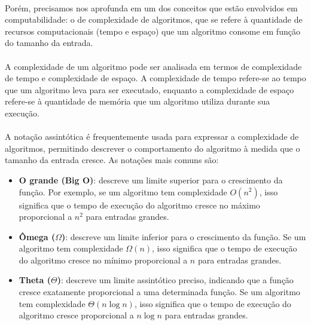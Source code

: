 \documentclass[12pt,a4paper]{article}
\def\emph#1{#1}%
\begin{document}
\paragraph{}
Porém, precisamos nos aprofunda em um dos conceitos que estão envolvidos em computabilidade: o de \emph{complexidade de algoritmos}, que se refere à quantidade de recursos computacionais (tempo e espaço) que um algoritmo consome em função do tamanho da entrada.

\paragraph{}
A complexidade de um algoritmo pode ser analisada em termos de \emph{complexidade de tempo} e \emph{complexidade de espaço}. A complexidade de tempo refere-se ao tempo que um algoritmo leva para ser executado, enquanto a complexidade de espaço refere-se à quantidade de memória que um algoritmo utiliza durante sua execução.

\paragraph{}
A notação assintótica é frequentemente usada para expressar a complexidade de algoritmos, permitindo descrever o comportamento do algoritmo à medida que o tamanho da entrada cresce. As notações mais comuns são:
\begin{itemize}\setlength{\itemsep}{2pt}
    \item \textbf{O grande (Big O)}: descreve um limite superior para o crescimento da função. Por exemplo, se um algoritmo tem complexidade \(O(n^2)\), isso significa que o tempo de execução do algoritmo cresce no máximo proporcional a \(n^2\) para entradas grandes.
    \item \textbf{Ômega (\(\Omega\))}: descreve um limite inferior para o crescimento da função. Se um algoritmo tem complexidade \(\Omega(n)\), isso significa que o tempo de execução do algoritmo cresce no mínimo proporcional a \(n\) para entradas grandes.
    \item \textbf{Theta (\(\Theta\))}: descreve um limite assintótico preciso, indicando que a função cresce exatamente proporcional a uma determinada função. Se um algoritmo tem complexidade \(\Theta(n \log n)\), isso significa que o tempo de execução do algoritmo cresce proporcional a \(n \log n\) para entradas grandes.
\end{itemize}
\end{document}
